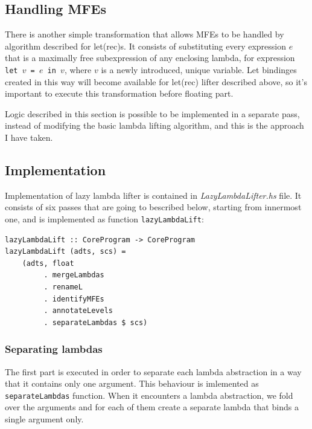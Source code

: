 \documentclass[12pt,a4paper]{report}
\begin{document}
\subsection{Handling MFEs}
There is another simple transformation that allows MFEs to be handled by
algorithm described for let(rec)s. It consists of substituting every expression
$e$ that is a maximally free subexpression of any enclosing lambda, for
expression \texttt{let $v$ = $e$ in $v$}, where $v$ is a newly introduced,
unique variable. Let bindinges created in this way will become available for
let(rec) lifter described above, so it's important to execute this
transformation before floating part.

Logic described in this section is possible to be implemented in a separate
pass, instead of modifying the basic lambda lifting algorithm, and this is the
approach I have taken.

\subsection{Implementation}
Implementation of lazy lambda lifter is contained in
\textit{LazyLambdaLifter.hs} file. It consists of six passes that are going to
bescribed below, starting from innermost one, and is implemented as function
\texttt{lazyLambdaLift}:

\vspace*{0.2in}
\begin{lstlisting}[style=haskell]
lazyLambdaLift :: CoreProgram -> CoreProgram
lazyLambdaLift (adts, scs) =
    (adts, float
         . mergeLambdas
         . renameL
         . identifyMFEs
         . annotateLevels
         . separateLambdas $ scs)
\end{lstlisting}

\subsubsection{Separating lambdas}
The first part is executed in order to separate each lambda abstraction in a
way that it contains only one argument. This behaviour is imlemented as
\texttt{separateLambdas} function. When it encounters a lambda abstraction, we
fold over the arguments and for each of them create a separate lambda that
binds a single argument only.
\end{document}
